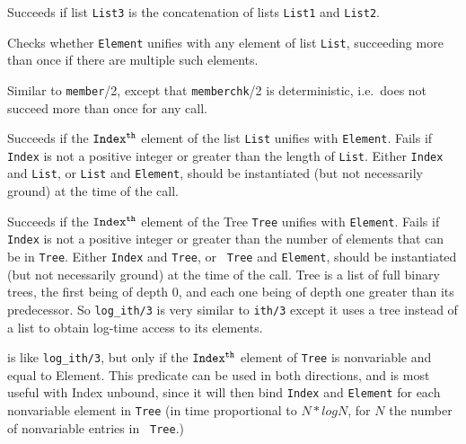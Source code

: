 \begin{description}
    Succeeds if list {\tt List3} is the concatenation of lists 
    {\tt List1} and {\tt List2}.

    Checks whether {\tt Element} unifies with any element of list 
    {\tt List}, succeeding more than once if there are multiple 
    such elements.

    Similar to {\tt member}/2, except that {\tt memberchk}/2 is
    deterministic, i.e.\ does not succeed more than once for any call.

    Succeeds if the ${\tt Index^{th}}$ element of the list {\tt List} 
    unifies with {\tt Element}.  Fails if {\tt Index} is not a positive
    integer or greater than the length of {\tt List}.
    Either {\tt Index} and {\tt List}, or {\tt List} and {\tt Element}, 
    should be instantiated (but not necessarily ground) at the time of 
    the call.

    Succeeds if the ${\tt Index^{th}}$ element of the Tree {\tt Tree}
    unifies with {\tt Element}.  Fails if {\tt Index} is not a
    positive integer or greater than the number of elements that can
    be in {\tt Tree}.  Either {\tt Index} and {\tt Tree}, or {\tt
    Tree} and {\tt Element}, should be instantiated (but not
    necessarily ground) at the time of the call.  Tree is a list of
    full binary trees, the first being of depth 0, and each one being
    of depth one greater than its predecessor.  So {\tt log\_ith/3} is
    very similar to {\tt ith/3} except it uses a tree instead of a
    list to obtain log-time access to its elements.

    is like {\tt log\_ith/3}, but only if the ${\tt Index^{th}}$ element
    of {\tt Tree} is nonvariable and equal to Element.  This predicate
    can be used in both directions, and is most useful with Index
    unbound, since it will then bind {\tt Index} and {\tt Element} for
    each nonvariable element in {\tt Tree} (in time proportional to
    $N*logN$, for $N$ the number of nonvariable entries in {\tt
    Tree}.)


\end{description}
